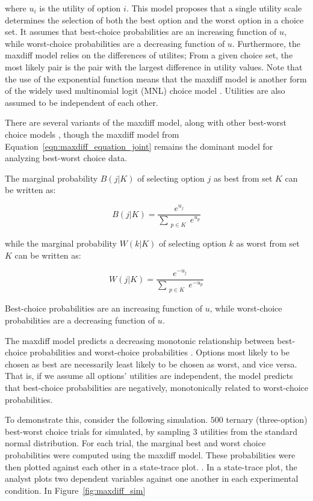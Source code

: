 where $u_{i}$ is the utility of option $i$. This model proposes that a single utility scale determines the selection of both the best option and the worst option in a choice set. It assumes that best-choice probabilities are an increasing function of $u$, while worst-choice probabilities are a decreasing function of $u$. Furthermore, the maxdiff model relies on the differences of utilites; From a given choice set, the most likely pair is the pair with the largest difference in utility values. Note that the use of the exponential function means that the maxdiff model is another form of the widely used multinomial logit (MNL) choice model \parencite{hausman1984specification}. Utilities are also assumed to be independent of each other.

There are several variants of the maxdiff model, along with other best-worst choice models \parencite{marleyProbabilisticModelsBest2005,marleyProbabilisticModelsSetdependent2008,marleyModelsBestWorst2012,flynnBestWorstScaling2007,flynn2014best}, though the maxdiff model from Equation~\ref{eqn:maxdiff_equation_joint} remains the dominant model for analyzing best-worst choice data.

The marginal probability $B(j|K)$ of selecting option $j$ as best from set $K$ can be written as:

\begin{equation}
   B(j|K)=\frac{e^{u_{j}}}{\sum_{\substack{{p}\in K}} e^{u_{p}}}
\end{equation}

while the marginal probability $W(k|K)$ of selecting option $k$ as worst from set $K$ can be written as:

\begin{equation}
   W(j|K)=\frac{e^{-u_{j}}}{\sum_{\substack{{p}\in K}} e^{-u_{p}}}
\end{equation}

Best-choice probabilities are an increasing function of $u$, while worst-choice probabilities are a decreasing function of $u$.

The maxdiff model predicts a decreasing monotonic relationship between best-choice probabilities and worst-choice probabilities \parencite{hawkinsBestTimesWorst2014}. Options most likely to be chosen as best are necessarily least likely to be chosen as worst, and vice versa. That is, if we assume all options' utilities are independent, the model predicts that best-choice probabilities are negatively, monotonically related to worst-choice probabilities. 

To demonstrate this, consider the following simulation. $500$ ternary (three-option) best-worst choice trials for simulated, by sampling 3 utilities from the standard normal distribution. For each trial, the marginal best and worst choice probabilities were computed using the maxdiff model. These probabilities were then plotted against each other in a state-trace plot. \parencite{bamber1979state}. In a state-trace plot, the analyst plots two dependent variables against one another in each experimental condition. In Figure~\ref{fig:maxdiff_sim} 

